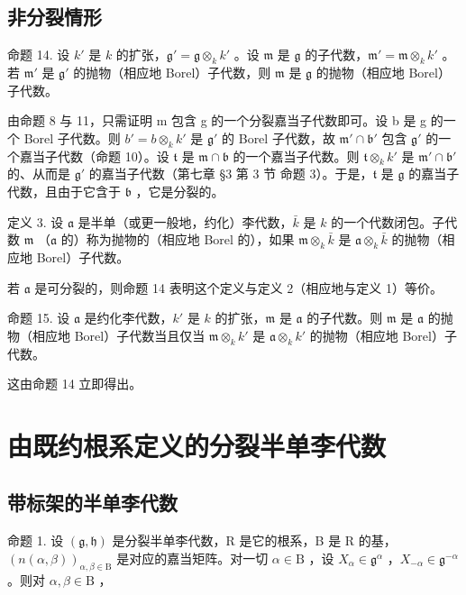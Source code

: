 \subsection{非分裂情形}

命题 14. 设 \(k'\) 是 \(k\) 的扩张，\(\mathfrak{g}' = \mathfrak{g} \otimes_k k'\) 。设 \(\mathfrak{m}\) 是 \(\mathfrak{g}\) 的子代数，\(\mathfrak{m}' = \mathfrak{m} \otimes_k k'\) 。若 \(\mathfrak{m}'\) 是 \(\mathfrak{g}'\) 的抛物（相应地 Borel）子代数，则 \(\mathfrak{m}\) 是 \(\mathfrak{g}\) 的抛物（相应地 Borel）子代数。

由命题 8 与 11，只需证明 m 包含 g 的一个分裂嘉当子代数即可。设 b 是 g 的一个 Borel 子代数。则 \(b' = b \otimes_{k} k'\) 是 \(\mathfrak{g}'\) 的 Borel 子代数，故 \(\mathfrak{m}' \cap \mathfrak{b}'\) 包含 \(\mathfrak{g}'\) 的一个嘉当子代数（命题 10）。设 \(\mathfrak{t}\) 是 \(\mathfrak{m} \cap \mathfrak{b}\) 的一个嘉当子代数。则 \(\mathfrak{t} \otimes_k k'\) 是 \(\mathfrak{m}' \cap \mathfrak{b}'\) 的、从而是 \(\mathfrak{g}'\) 的嘉当子代数（第七章 §3 第 3 节 命题 3）。于是，\(\mathfrak{t}\) 是 \(\mathfrak{g}\) 的嘉当子代数，且由于它含于 \(\mathfrak{b}\) ，它是分裂的。

定义 3. 设 \(\mathfrak{a}\) 是半单（或更一般地，约化）李代数，\(\bar{k}\) 是 \(k\) 的一个代数闭包。子代数 \(\mathfrak{m}\) （\(\mathfrak{a}\) 的）称为抛物的（相应地 Borel 的），如果 \(\mathfrak{m} \otimes_k \bar{k}\) 是 \(\mathfrak{a} \otimes_k \bar{k}\) 的抛物（相应地 Borel）子代数。

若 \(\mathfrak{a}\) 是可分裂的，则命题 14 表明这个定义与定义 2（相应地与定义 1）等价。

命题 15. 设 \(\mathfrak{a}\) 是约化李代数，\(k'\) 是 \(k\) 的扩张，\(\mathfrak{m}\) 是 \(\mathfrak{a}\) 的子代数。则 \(\mathfrak{m}\) 是 \(\mathfrak{a}\) 的抛物（相应地 Borel）子代数当且仅当 \(\mathfrak{m} \otimes_k k'\) 是 \(\mathfrak{a} \otimes_k k'\) 的抛物（相应地 Borel）子代数。

这由命题 14 立即得出。

\section{由既约根系定义的分裂半单李代数}

\subsection{带标架的半单李代数}

命题 1. 设 \((\mathfrak{g},\mathfrak{h})\) 是分裂半单李代数，R 是它的根系，B 是 R 的基，\((n(\alpha ,\beta))_{\alpha ,\beta \in \mathrm{B}}\) 是对应的嘉当矩阵。对一切 \(\alpha \in \mathrm{B}\) ，设 \(X_{\alpha}\in \mathfrak{g}^{\alpha}\) ，\(X_{-\alpha}\in \mathfrak{g}^{-\alpha}\) 。则对 \(\alpha ,\beta \in \mathrm{B}\) ，

